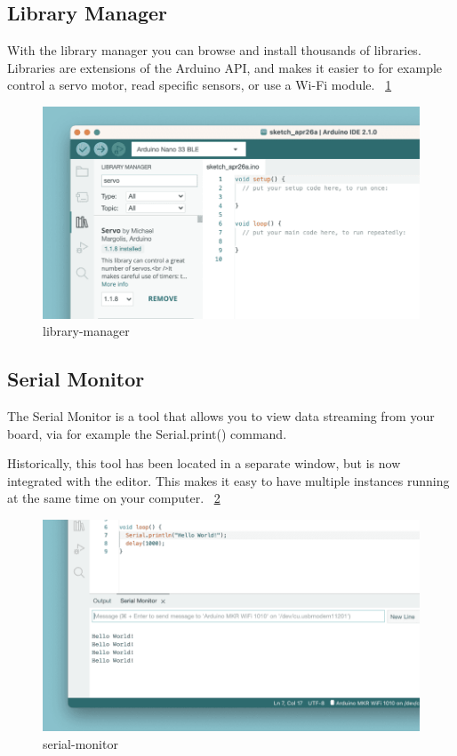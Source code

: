 	\subsection{Library Manager}
	With the library manager you can browse and install thousands of libraries. Libraries are extensions of the Arduino API, and makes it easier to for example control a servo motor, read specific sensors, or use a Wi-Fi module. ~\ref{library-manager}
	
	\begin{figure}
		\begin{center}
			\includegraphics[width=0.7\linewidth]{Images/Arduino/library-manager.png}
			\caption{library-manager}
			\label{library-manager}
		\end{center}
	\end{figure}
	
	\subsection{Serial Monitor}
	The Serial Monitor is a tool that allows you to view data streaming from your board, via for example the Serial.print() command.
	
	Historically, this tool has been located in a separate window, but is now integrated with the editor. This makes it easy to have multiple instances running at the same time on your computer. ~\ref{serial-monitor}
	
	\begin{figure}
		\begin{center}
			\includegraphics[width=0.7\linewidth]{Images/Arduino/serial-monitor.png}
			\caption{serial-monitor}
			\label{serial-monitor}
		\end{center}
	\end{figure}
	
